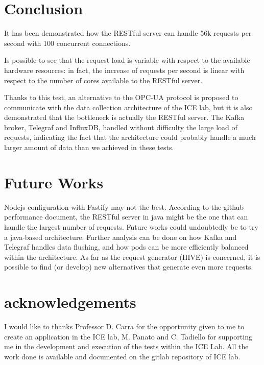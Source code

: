 \documentclass[]{IEEEtran}
\begin{document}
\section{Conclusion}
It has been demonstrated how the RESTful server can handle 56k requests per second with 100 concurrent connections.

Is possible to see that the request load is variable with respect to the available hardware resources: in fact, the increase of requests per second is linear with respect to the number of cores available to the RESTful server.

Thanks to this test, an alternative to the OPC-UA protocol is proposed to communicate with the data collection architecture of the ICE lab, but it is also demonstrated that the bottleneck is actually the RESTful server. The Kafka broker, Telegraf and InfluxDB, handled without difficulty the large load of requests, indicating the fact that the architecture could probably handle a much larger amount of data than we achieved in these tests.



\section{Future Works}
Nodejs configuration with Fastify may not the best. According to the github ~\cite{gitweb} performance document, the RESTful server in java might be the one that can handle the largest number of requests. Future works could undoubtedly be to try a java-based architecture.
Further analysis can be done on how Kafka and Telegraf handles data flushing, and how pods can be more efficiently balanced within the architecture.
As far as the request generator (HIVE) is concerned, it is possible to find (or develop) new alternatives that generate even more requests.

\section{acknowledgements}
I would like to thanks Professor D. Carra for the opportunity given to me to create an application in the ICE lab, M. Panato and C. Tadiello for supporting me in the development and execution of the tests within the ICE Lab.
All the work done is available and documented on the gitlab repository of ICE lab.



    
    
\end{document}
